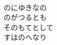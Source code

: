 \documentclass[10pt,b5j]{tarticle} %
\begin{document}
\begin{enumerate}
\begin{minipage}[c]{\blocksize}
    \end{minipage}
    \begin{minipage}[c]{\blocksize}
        
        \vspace{\linespace}
        \item~\\
        のにゆきなの\\
        のがつるとも\\
        そのもてとして\\
        すはのへなり
    
    \end{minipage}
\end{enumerate} %
\end{document}

